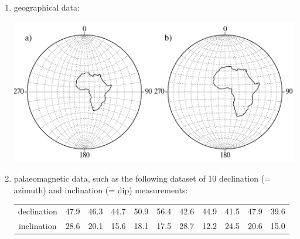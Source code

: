\begin{enumerate}

\item geographical data:

\noindent\begin{minipage}[t][][b]{.6\linewidth}
\includegraphics[]{../figures/Africa.pdf}\medskip
\end{minipage}
\begin{minipage}[t][][t]{.4\linewidth}
  \label{fig:Africa}
\end{minipage}

\item palaeomagnetic data, such as the following dataset of 10
  declination (= azimuth) and inclination (= dip) measurements:

\begin{tabular}{c|cccccccccc}
declination & 47.9 & 46.3 & 44.7 & 50.9 & 56.4 & 42.6 & 44.9 & 41.5 & 47.9 & 39.6 \\
inclination & 28.6 & 20.1 & 15.6 & 18.1 & 17.5 & 28.7 & 12.2 & 24.5 & 20.6 & 15.0 \\
\end{tabular}


\end{enumerate}
